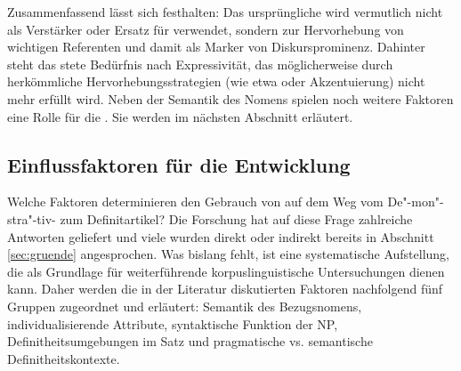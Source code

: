 Zusammenfassend lässt sich festhalten: Das ursprüngliche  wird vermutlich nicht als Verstärker oder Ersatz für  verwendet, sondern zur Hervorhebung von wichtigen Referenten und damit als Marker von Diskursprominenz. Dahinter steht das stete Bedürfnis nach Expressivität, das möglicherweise durch herkömmliche Hervorhebungsstrategien (wie etwa  oder Akzentuierung) nicht mehr erfüllt wird. Neben der Semantik des Nomens spielen noch weitere Faktoren eine Rolle für die . Sie werden im nächsten Abschnitt erläutert.   

\subsection{Einflussfaktoren für die Entwicklung} \label{sec:extension}

Welche Faktoren determinieren den Gebrauch von  auf dem Weg vom De"-mon"-stra"-tiv- zum Definitartikel?  Die Forschung hat auf diese Frage zahlreiche Antworten geliefert und viele wurden direkt oder indirekt bereits in Abschnitt \ref{sec:gruende} angesprochen.  Was bislang  fehlt, ist eine systematische Aufstellung, die als Grundlage für weiterführende korpuslinguistische  Untersuchungen dienen kann.  
Daher werden die in der Literatur diskutierten Faktoren nachfolgend fünf Gruppen zugeordnet und erläutert: Semantik des Bezugsnomens, individualisierende  Attribute, syntaktische Funktion der  NP, Definitheitsumgebungen im Satz und pragmatische vs. semantische Definitheitskontexte.   



